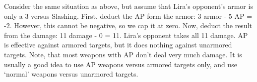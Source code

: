 \documentclass[twoside]{book}
\begin{document}
  

    Consider the same situation as above, but assume
                 that Lira's opponent's armor is only a 3
                 versus Slashing. First, deduct the AP form the armor: 3
                 armor - 5 AP = -2. However, this cannot be negative, so
                 we cap it at zero. Now, deduct the result from the
                 damage: 11 damage - 0 = 11. Lira's opponent takes
                 all 11 damage.  AP is effective against armored targets, but it
                 does nothing against unarmored targets. Note, that most
                 weapons with AP don't deal very much damage. It is
                 usually a good idea to use AP weapons versus armored
                 targets only, and use `normal' weapons
                 versus unarmored targets. 
    
\end{document}
